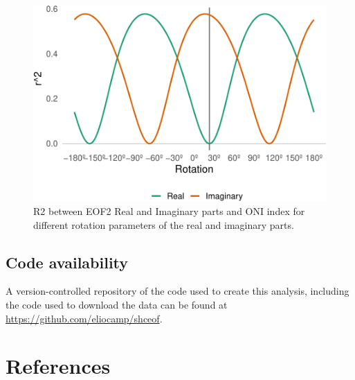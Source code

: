 \documentclass[smallextended]{svjour3}       %
\begin{document}
\begin{figure}
\centering
\includegraphics{../figures/rotations-pc2-1.pdf}
\caption{\label{fig:rotations-pc2}R2 between EOF2 Real and Imaginary parts and ONI index for different rotation parameters of the real and imaginary parts.}
\end{figure}

\hypertarget{code-availability}{%
\subsection*{Code availability}\label{code-availability}}

A version-controlled repository of the code used to create this analysis, including the code used to download the data can be found at \url{https://github.com/eliocamp/shceof}.

\hypertarget{references}{%
\section{References}\label{references}}




\end{document}

